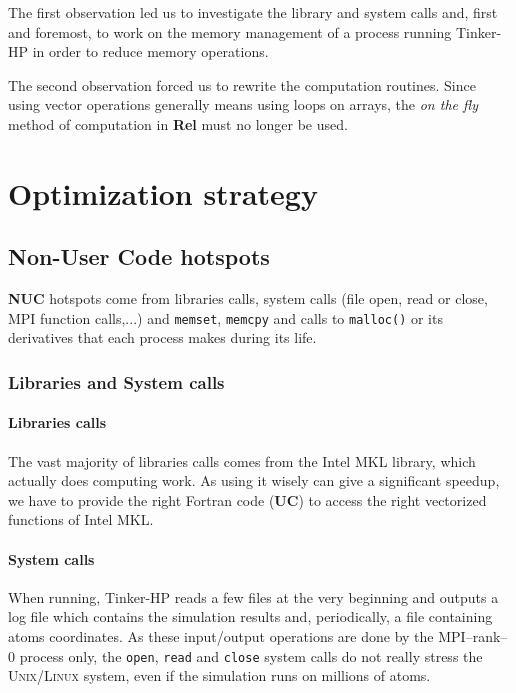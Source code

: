 \documentclass[9pt,comparison]{livecoms}
\newcommand{\lv}{\Large\verb}
\begin{document}
The first observation led us to investigate the library and system calls and, first and foremost, to work on the memory management of a process running Tinker-HP in order to reduce memory operations.

The second observation forced us to rewrite the computation routines. Since using vector operations generally means using loops on arrays, the \emph{on the fly} method of computation in \textbf{Rel} must no longer be used. 

\section{Optimization strategy}
\subsection{Non-User Code hotspots}
\hspace{\parindent}\textbf{NUC} hotspots come from libraries calls, system calls (file open, read or close, MPI function calls,...) and {\color{codegreen}\lv|memset|}, {\color{codegreen}\lv|memcpy|} and calls to {\color{codegreen}\lv|malloc()|} or its derivatives that each process makes during its life.
\subsubsection{Libraries and System calls}
\paragraph{Libraries calls}
\hspace{\parindent}The vast majority of libraries calls comes from the Intel MKL library, which actually does computing work. As using it wisely can give a significant speedup, we have to provide the right  Fortran code (\textbf{UC}) to access the right vectorized functions of Intel MKL.
\paragraph{System calls}
\hspace{\parindent} When running, Tinker-HP reads a few files at the very beginning and outputs a log file which contains the simulation results and, periodically, a file containing atoms coordinates. As these input/output operations are done by the MPI--rank--0  process only,  the {\color{blue}\lv|open|}, {\color{blue}\lv|read|} and {\color{blue}\lv|close|}  system calls  do not really stress the \textsc{Unix/Linux} system, even if the simulation runs on millions of atoms.
\end{document}
